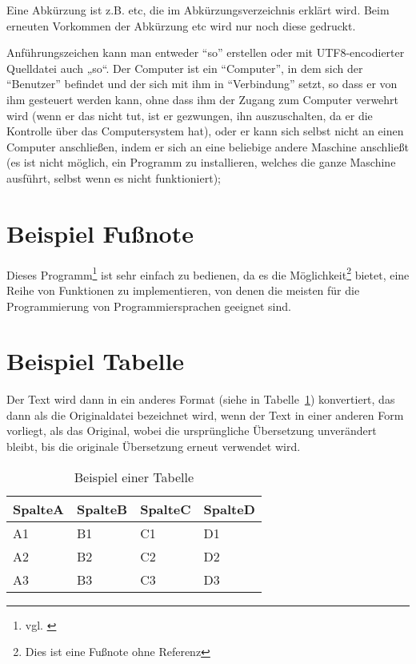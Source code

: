 %
%
Eine Abkürzung ist z.B. \gls{etc}, die im Abkürzungsverzeichnis erklärt wird. Beim erneuten Vorkommen der Abkürzung \gls{etc} wird nur noch diese gedruckt.

%
%
Anführungszeichen kann man entweder \enquote{so} erstellen oder mit UTF8-encodierter Quelldatei auch „so“.
Der Computer ist ein \enquote{Computer}, in dem sich der \enquote{Benutzer} befindet und der sich mit ihm in \enquote{Verbindung} setzt, so dass er von ihm gesteuert werden kann, ohne dass ihm der Zugang zum Computer verwehrt wird (wenn er das nicht tut, ist er gezwungen, ihn auszuschalten, da er die Kontrolle über das Computersystem hat), oder er kann sich selbst nicht an einen Computer anschließen, indem er sich an eine beliebige andere Maschine anschließt (es ist nicht möglich, ein Programm zu installieren, welches die ganze Maschine ausführt, selbst wenn es nicht funktioniert);

\section{Beispiel Fußnote}

%
%
Dieses Programm\footnote{vgl. \cite{jurafsky2009}}
ist sehr einfach zu bedienen, da es die Möglichkeit\footnote{Dies ist eine Fußnote ohne Referenz}
bietet, eine Reihe von Funktionen zu implementieren, von denen die meisten für die Programmierung von Programmiersprachen geeignet sind.

\section{Beispiel Tabelle}

Der Text wird dann in ein anderes Format (siehe in Tabelle~\ref{tab:tabellenlabel1}) 
konvertiert, das dann als die Originaldatei bezeichnet wird, wenn der Text in einer anderen Form vorliegt, als das Original, wobei die ursprüngliche Übersetzung unverändert bleibt, bis die originale Übersetzung erneut verwendet wird.

%
%
\begin{table}[htbp]
\centering
\begin{tabular}{l|l|l|l}
SpalteA & SpalteB & SpalteC & SpalteD \\
\midrule
A1 & B1 & C1 & D1 \\
A2 & B2 & C2 & D2 \\
A3 & B3 & C3 & D3
\end{tabular}
\caption{Beispiel einer Tabelle}
\label{tab:tabellenlabel1}
\end{table}

